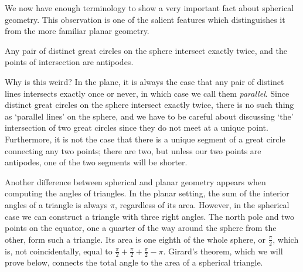 We now have enough terminology to show a very important fact about spherical geometry.  This  observation is one of the salient features which distinguishes it from the more familiar planar geometry.


\begin{claim}
	Any pair of distinct great circles on the sphere intersect exactly twice, and the points of intersection are antipodes.
\end{claim}



Why is this weird? In the plane, it is always the case that any pair of distinct lines intersects exactly once or never, in which case we call them \textit{parallel}. Since distinct great circles on the sphere intersect exactly twice, there is no such thing as \enquote*{parallel lines} on the sphere, and we have to be careful about discussing `the' intersection of two great circles since they do not meet at a unique point.  Furthermore, it is not the case that there is a unique segment of a great circle connecting any two points; there are two, but unless our two points are antipodes, one of the two segments will be shorter. 




Another difference between spherical and planar geometry appears when computing the angles of triangles. In the planar setting, the sum of the interior angles of a triangle is always $\pi$, regardless of its area. However, in the spherical case we can construct a triangle with three right angles. The north pole and two points on the equator, one a quarter of the way around the sphere from the other, form such a triangle.  Its area is one eighth of the whole sphere, or $\tfrac{\pi}{2}$, which is, not coincidentally, equal to $\tfrac{\pi}{2}+\tfrac{\pi}{2}+\tfrac{\pi}{2} - \pi$. Girard's theorem, which we will prove below, connects the total angle to the area of a spherical triangle.


